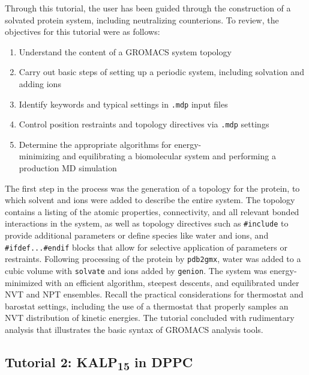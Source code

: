 \documentclass[9pt,tutorial,pubversion]{livecoms}
\begin{document}
Through this tutorial, the user has been guided through the construction of a solvated protein system, including neutralizing counterions. To review, the objectives for this tutorial were as follows:

\begin{enumerate}
	\item Understand the content of a GROMACS system topology
	\item Carry out basic steps of setting up a periodic system, including solvation and adding ions
	\item Identify keywords and typical settings in \texttt{.mdp} input files
	\item Control position restraints and topology directives via \texttt{.mdp} settings
	\item Determine the appropriate algorithms for energy-\\minimizing and equilibrating a biomolecular system and performing a production MD simulation
\end{enumerate}

The first step in the process was the generation of a topology for the protein, to which solvent and ions were added to describe the entire system. The topology contains a listing of the atomic properties, connectivity, and all relevant bonded interactions in the system, as well as topology directives such as \texttt{\#include} to provide additional parameters or define species like water and ions, and \texttt{\#ifdef...\#endif} blocks that allow for selective application of parameters or restraints. Following processing of the protein by \texttt{pdb2gmx}, water was added to a cubic volume with \texttt{solvate} and ions added by \texttt{genion}. The system was energy-minimized with an efficient algorithm, steepest descents, and equilibrated under NVT and NPT ensembles. Recall the practical considerations for thermostat and barostat settings, including the use of a thermostat that properly samples an NVT distribution of kinetic energies. The tutorial concluded with rudimentary analysis that illustrates the basic syntax of GROMACS analysis tools.



\subsection{Tutorial 2: KALP\textsubscript{15} in DPPC} \label{kalp}
\end{document}

